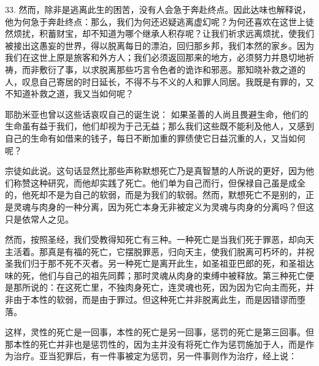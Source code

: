 33. 然而，除非是逃离此生的困苦，没有人会急于奔赴终点。因此达味也解释说，他为何急于奔赴终点：那么，我们为何还迟疑逃离虚幻呢？为何还喜欢在这世上徒然烦扰，积蓄财宝，却不知道为哪个继承人积存呢？让我们祈求远离烦扰，使我们被接出这愚妄的世界，得以脱离每日的漂泊，回归那乡邦，我们本然的家乡。因为我们在这世上原是旅客和外方人；我们必须返回那来的地方，必须努力并恳切地祈祷，而非敷衍了事，以求脱离那些巧言令色者的诡诈和邪恶。那知晓补救之道的人，叹息自己寄居的时日延长，不得不与不义的人和罪人同居。我既是有罪的，又不知道补救之道，我又当如何呢？\par

耶肋米亚也曾以这些话哀叹自己的诞生说： 如果圣善的人尚且畏避生命，他们的生命虽有益于我们，他们却视为于己无益；那么我们这些既不能利及他人，又感到自己的生命有如借来的钱子，每日不断加重的罪债使它日益沉重的人，又当如何呢？\par

宗徒如此说。这句话显然比那些声称默想死亡乃是真智慧的人所说的更好，因为他们称赞这种研究，而他却实践了死亡。他们单为自己而行，但保禄自己虽是成全的，他死却不是为自己的软弱，而是为我们的软弱。然而，默想死亡不是别的，正是灵魂与肉身的一种分离，因为死亡本身无非被定义为灵魂与肉身的分离吗？但这只是依常人之见。\par

然而，按照圣经，我们受教得知死亡有三种。一种死亡是当我们死于罪恶，却向天主活着。那真是有福的死亡，它摆脱罪恶，归向天主，使我们脱离可朽坏的，并祝圣我们归于那不死不灭者。另一种死亡是离开此生，如圣祖亚巴郎的死，和圣祖达味的死，他们与自己的祖先同葬；那时灵魂从肉身的束缚中被释放。第三种死亡便是那所说的：在这死亡里，不独肉身死亡，连灵魂也死，因为因为它向主而死，并非由于本性的软弱，而是由于罪过。但这种死亡并非脱离此生，而是因错谬而堕落。\par

这样，灵性的死亡是一回事，本性的死亡是另一回事，惩罚的死亡是第三回事。但那本性的死亡并非也是惩罚性的，因为主并没有将死亡作为惩罚施加于人，而是作为治疗。亚当犯罪后，有一件事被定为惩罚，另一件事则作为治疗，经上说：\par

